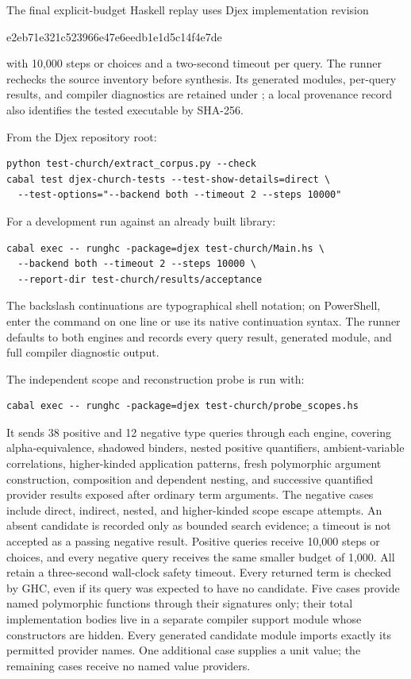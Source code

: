 \documentclass[11pt]{article}
\begin{document}
The final explicit-budget Haskell replay uses Djex implementation revision
\begin{center}\small\ttfamily
e2eb71e321c523966e47e6eedb1e1d5c14f4e7de
\end{center}
with 10,000 steps or choices and a two-second timeout per query. The runner
rechecks the source inventory before synthesis. Its generated modules,
per-query results, and compiler diagnostics are retained under
; a local provenance record
also identifies the tested executable by SHA-256.

From the Djex repository root:
\begin{lstlisting}
python test-church/extract_corpus.py --check
cabal test djex-church-tests --test-show-details=direct \
  --test-options="--backend both --timeout 2 --steps 10000"
\end{lstlisting}
For a development run against an already built library:
\begin{lstlisting}
cabal exec -- runghc -package=djex test-church/Main.hs \
  --backend both --timeout 2 --steps 10000 \
  --report-dir test-church/results/acceptance
\end{lstlisting}
The backslash continuations are typographical shell notation; on PowerShell,
enter the command on one line or use its native continuation syntax. The
runner defaults to both engines and records every query result, generated
module, and full compiler diagnostic output.

The independent scope and reconstruction probe is run with:
\begin{lstlisting}
cabal exec -- runghc -package=djex test-church/probe_scopes.hs
\end{lstlisting}
It sends 38 positive and 12 negative type queries through each engine,
covering alpha-equivalence, shadowed binders, nested positive quantifiers,
ambient-variable correlations, higher-kinded application patterns, fresh
polymorphic argument construction, composition and dependent nesting, and
successive quantified provider results exposed after ordinary term arguments.
The
negative cases include direct, indirect, nested, and higher-kinded scope
escape attempts. An absent candidate is recorded only as bounded search
evidence; a timeout is not accepted as a passing negative result. Positive
queries receive 10,000 steps or choices, and every negative query receives
the same smaller budget of 1,000. All retain a three-second wall-clock
safety timeout. Every
returned term is checked by GHC, even if its query was expected to have no
candidate. Five cases provide named polymorphic functions through their
signatures only; their total implementation bodies live in a separate
compiler support module whose constructors are hidden. Every generated
candidate module imports exactly its permitted provider names. One additional
case supplies a unit value; the remaining cases receive no named value
providers.
\end{document}
